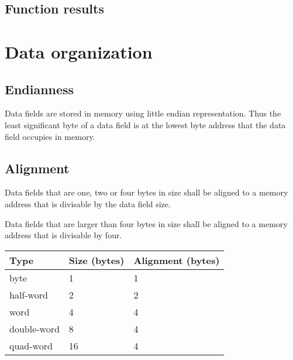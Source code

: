 \tbd

\subsection{Function results}
\label{sec:abi_function_results}

\tbd

\section{Data organization}

\subsection{Endianness}

Data fields are stored in memory using little endian representation. Thus the
least significant byte of a data field is at the lowest byte address that the
data field occupies in memory.

\subsection{Alignment}

Data fields that are one, two or four bytes in size shall be aligned to a
memory address that is divisable by the data field size.

Data fields that are larger than four bytes in size shall be aligned to a
memory address that is divisable by four.

\begin{tabular}{|l|l|l|}
  \hline
  \textbf{Type} & \textbf{Size (bytes)} & \textbf{Alignment (bytes)} \\
  \hline
  byte & 1 & 1 \\
  \hline
  half-word & 2 & 2 \\
  \hline
  word & 4 & 4 \\
  \hline
  double-word & 8 & 4 \\
  \hline
  quad-word & 16 & 4 \\
  \hline
\end{tabular}
